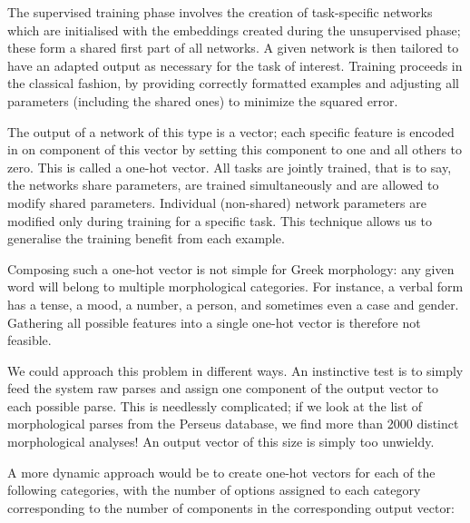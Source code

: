 The supervised training phase involves the creation of task-specific
networks which are initialised with the embeddings created during the
unsupervised phase; these form a shared first part of all networks. A
given network is then tailored to have an adapted output as necessary
for the task of interest. Training proceeds in the classical fashion,
by providing correctly formatted examples and adjusting all parameters
(including the shared ones) to minimize the squared error.

The output of a network of this type is a vector; each specific
feature is encoded in on component of this vector by setting this
component to one and all others to zero. This is called a one-hot
vector. All tasks are jointly trained, that is to say, the networks
share parameters, are trained simultaneously and are allowed to modify
shared parameters. Individual (non-shared) network parameters are
modified only during training for a specific task. This technique
allows us to generalise the training benefit from each example.

Composing such a one-hot vector is not simple for Greek morphology:
any given word will belong to multiple morphological categories. For
instance, a verbal form has a tense, a mood, a number, a person, and
sometimes even a case and gender. Gathering all possible features into a
single one-hot vector is therefore not feasible.

We could approach this problem in different ways. An instinctive test
is to simply feed the system raw parses and assign one component of
the output vector to each possible parse. This is needlessly
complicated; if we look at the list of morphological parses from the
Perseus database, we find more than 2000 distinct morphological
analyses! An output vector of this size is simply too unwieldy.

A more dynamic approach would be to create one-hot vectors for each of
the following categories, with the number of options assigned to each
category corresponding to the number of components in the
corresponding output vector:

